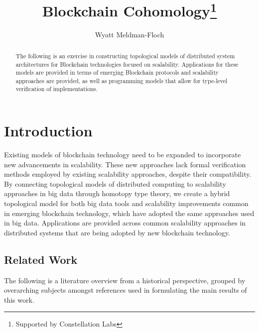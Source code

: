 \documentclass[runningheads]{llncs}
\begin{document}
%
\title{Blockchain Cohomology\thanks{Supported by Constellation Labs}}
%
%
\author{Wyatt Meldman-Floch }
%
%
%
\maketitle              %
%
\begin{abstract}
The following is an exercise in constructing topological models of distributed system architectures for Blockchain technologies focused on scalability. Applications for these models are provided in terms of emerging Blockchain protocols and scalability approaches are provided, as well as programming models that allow for type-level verification of implementations.
\end{abstract}
%
%
%
\section{Introduction} 
Existing models of blockchain technology need to be expanded to incorporate new advancements in scalability. These new approaches lack formal verification methods employed by existing scalability approaches, despite their compatibility. By connecting topological models of distributed computing to scalability approaches in big data through homotopy type theory, we create a hybrid topological model for both big data tools and scalability improvements common in emerging blockchain technology, which have adopted the same approaches used in big data. Applications are provided across common scalability approaches in distributed systems that are being adopted by new blockchain technology.

\subsection{Related Work}
The following is a literature overview from a historical perspective, grouped by overarching subjects amongst references used in formulating the main results of this work. 
\end{document}
